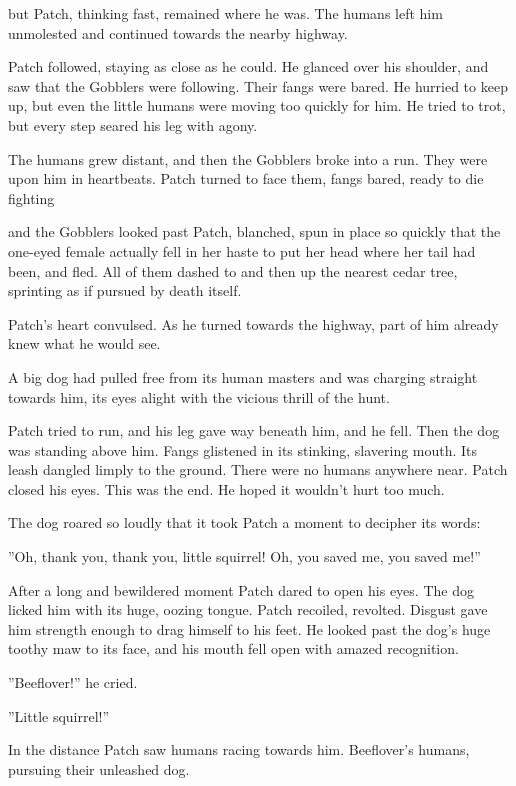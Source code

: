 \documentclass[11pt]{article}
\begin{document}
 but Patch, thinking fast, remained where he was. The humans left him unmolested and continued towards the nearby highway.\par
Patch followed, staying as close as he could. He glanced over his shoulder, and saw that the Gobblers were following. Their fangs were bared. He hurried to keep up, but even the little humans were moving too quickly for him. He tried to trot, but every step seared his leg with agony.\par
The humans grew distant, and then the Gobblers broke into a run. They were upon him in heartbeats. Patch turned to face them, fangs bared, ready to die fighting %
\par
 and the Gobblers looked past Patch, blanched, spun in place so quickly that the one-eyed female actually fell in her haste to put her head where her tail had been, and fled. All of them dashed to and then up the nearest cedar tree, sprinting as if pursued by death itself.\par
 Patch's heart convulsed. As he turned towards the highway, part of him already knew what he would see.\par
A big dog had pulled free from its human masters and was charging straight towards him, its eyes alight with the vicious thrill of the hunt.\par
 Patch tried to run, and his leg gave way beneath him, and he fell. Then the dog was standing above him. Fangs glistened in its stinking, slavering mouth. Its leash dangled limply to the ground. There were no humans anywhere near. Patch closed his eyes. This was the end. He hoped it wouldn't hurt too much.\par
 The dog roared so loudly that it took Patch a moment to decipher its words:\par
 ''Oh, thank you, thank you, little squirrel! Oh, you saved me, you saved me!''\par
 After a long and bewildered moment Patch dared to open his eyes. The dog licked him with its huge, oozing tongue. Patch recoiled, revolted. Disgust gave him strength enough to drag himself to his feet. He looked past the dog's huge toothy maw to its face, and his mouth fell open with amazed recognition.\par
 ''Beeflover!'' he cried.\par
 ''Little squirrel!''\par
 In the distance Patch saw humans racing towards him. Beeflover's humans, pursuing their unleashed dog.\par
\end{document}
